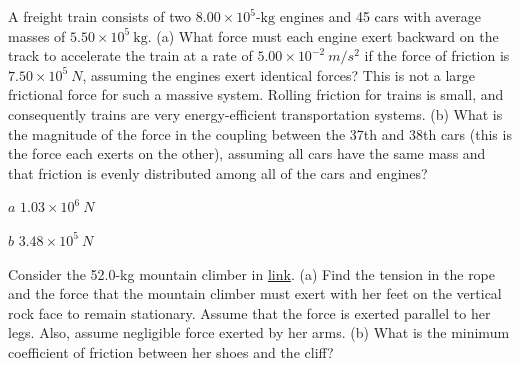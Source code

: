 \documentclass[
]{book}
\begin{document}
\hypertarget{fs-id1439017}{}
\leavevmode{}%
A freight train consists of two
\({8\text{.}{\text{00} \times \text{10}^{5}}\text{-kg}}{}\) engines and 45
cars with average masses of
\({5\text{.}{\text{50} \times \text{10}^{5}}\ \text{kg}}{}\). (a) What
force must each engine exert backward on the track to accelerate the
train at a rate of
\({5\text{.}{\text{00} \times \text{10}^{- 2}}\ {m/s^{2}}}{}\) if the
force of friction is \({7\text{.}{\text{50} \times \text{10}^{5}\ }N}{}\),
assuming the engines exert identical forces? This is not a large
frictional force for such a massive system. Rolling friction for trains
is small, and consequently trains are very energy-efficient
transportation systems. (b) What is the magnitude of the force in the
coupling between the 37th and 38th cars (this is the force each exerts
on the other), assuming all cars have the same mass and that friction is
evenly distributed among all of the cars and engines?

\leavevmode{}%
\(a\) \({1\text{.}{\text{03} \times \text{10}^{6}\ }N}{}\)

\(b\) \({3\text{.}{\text{48} \times \text{10}^{5}}\ N}{}\)

\hypertarget{fs-id1615856}{}
\leavevmode{}%
Consider the 52.0-kg mountain climber in
\protect\hyperlink{fs-id1165296580243}{link}. (a) Find the
tension in the rope and the force that the mountain climber must exert
with her feet on the vertical rock face to remain stationary. Assume
that the force is exerted parallel to her legs. Also, assume negligible
force exerted by her arms. (b) What is the minimum coefficient of
friction between her shoes and the cliff?
\end{document}
